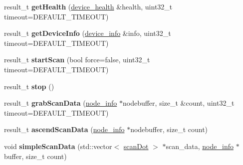\begin{DoxyCompactItemize}
\item 
result\+\_\+t {\bfseries get\+Health} (\hyperlink{structdevice__health}{device\+\_\+health} \&health, uint32\+\_\+t timeout=D\+E\+F\+A\+U\+L\+T\+\_\+\+T\+I\+M\+E\+O\+UT)\hypertarget{classydlidar_1_1_y_dlidar_driver_a9fe6f8b842a2aff2c3ae13f8423b03f4}{}\label{classydlidar_1_1_y_dlidar_driver_a9fe6f8b842a2aff2c3ae13f8423b03f4}

\item 
result\+\_\+t {\bfseries get\+Device\+Info} (\hyperlink{structdevice__info}{device\+\_\+info} \&info, uint32\+\_\+t timeout=D\+E\+F\+A\+U\+L\+T\+\_\+\+T\+I\+M\+E\+O\+UT)\hypertarget{classydlidar_1_1_y_dlidar_driver_ab75303116c4ccb144ecc215e94114e1a}{}\label{classydlidar_1_1_y_dlidar_driver_ab75303116c4ccb144ecc215e94114e1a}

\item 
result\+\_\+t {\bfseries start\+Scan} (bool force=false, uint32\+\_\+t timeout=D\+E\+F\+A\+U\+L\+T\+\_\+\+T\+I\+M\+E\+O\+UT)\hypertarget{classydlidar_1_1_y_dlidar_driver_a62888da8520422b7daaae89c2935460b}{}\label{classydlidar_1_1_y_dlidar_driver_a62888da8520422b7daaae89c2935460b}

\item 
result\+\_\+t {\bfseries stop} ()\hypertarget{classydlidar_1_1_y_dlidar_driver_a7aa354e88eeb6984be4d18eae6367a0b}{}\label{classydlidar_1_1_y_dlidar_driver_a7aa354e88eeb6984be4d18eae6367a0b}

\item 
result\+\_\+t {\bfseries grab\+Scan\+Data} (\hyperlink{structnode__info}{node\+\_\+info} $\ast$nodebuffer, size\+\_\+t \&count, uint32\+\_\+t timeout=D\+E\+F\+A\+U\+L\+T\+\_\+\+T\+I\+M\+E\+O\+UT)\hypertarget{classydlidar_1_1_y_dlidar_driver_a6d6e04efa9d7e5d4aea41ee53d4ea8af}{}\label{classydlidar_1_1_y_dlidar_driver_a6d6e04efa9d7e5d4aea41ee53d4ea8af}

\item 
result\+\_\+t {\bfseries ascend\+Scan\+Data} (\hyperlink{structnode__info}{node\+\_\+info} $\ast$nodebuffer, size\+\_\+t count)\hypertarget{classydlidar_1_1_y_dlidar_driver_a6494501f3fee2f6dc410f869bbc18cb9}{}\label{classydlidar_1_1_y_dlidar_driver_a6494501f3fee2f6dc410f869bbc18cb9}

\item 
void {\bfseries simple\+Scan\+Data} (std\+::vector$<$ \hyperlink{structscan_dot}{scan\+Dot} $>$ $\ast$scan\+\_\+data, \hyperlink{structnode__info}{node\+\_\+info} $\ast$buffer, size\+\_\+t count)\hypertarget{classydlidar_1_1_y_dlidar_driver_a797de2678c6c81c84a8126cf184a0254}{}\label{classydlidar_1_1_y_dlidar_driver_a797de2678c6c81c84a8126cf184a0254}


\end{DoxyCompactItemize}
